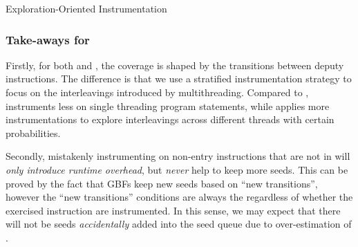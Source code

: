 \begin{algorithm}[t]
\caption{Exploration-Oriented Instrumentation}\label{algo:inst_explore}
\end{algorithm}

\subsubsection{Take-aways for \MTIns}
Firstly, for both \AFLIns and \MTIns, the coverage is shaped by the transitions between deputy instructions. The difference is that we use a stratified instrumentation strategy to focus on the interleavings introduced by multithreading. Compared to \AFLIns, \MTIns instruments less on single threading program statements, while applies more instrumentations to explore interleavings across different threads with certain probabilities.

Secondly, mistakenly instrumenting on non-entry instructions that are not in \mtiscope will \emph{only introduce runtime overhead}, but \emph{never} help to keep more seeds.
This can be proved by the fact that GBFs keep new seeds based on ``new transitions'', however the ``new transitions'' conditions are always the regardless of whether the exercised instruction are instrumented. 
In this sense, we may expect that there will not be seeds \emph{accidentally} added into the seed queue due to over-estimation of \mtiscope. 

